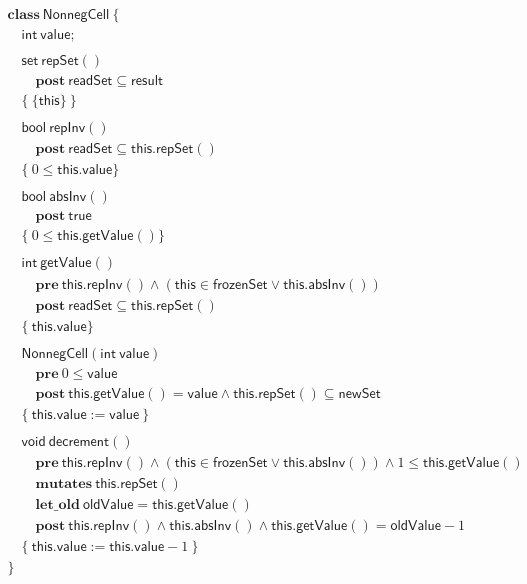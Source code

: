 \documentclass{article}
\begin{document}
$$\begin{array}{l}
\mathbf{class}\ \mathsf{NonnegCell}\ \{\\
\quad \mathsf{int}\ \mathsf{value};\\
\\
\quad \mathsf{set}\ \mathsf{repSet}()\\
\quad\quad \mathbf{post}\ \mathsf{readSet} \subseteq \mathsf{result}\\
\quad \{\ \{\mathsf{this}\}\ \}\\
\\
\quad \mathsf{bool}\ \mathsf{repInv}()\\
\quad\quad \mathbf{post}\ \mathsf{readSet} \subseteq \mathsf{this}.\mathsf{repSet}()\\
\quad \{\ 0 \le \mathsf{this}.\mathsf{value} \}\\
\\
\quad \mathsf{bool}\ \mathsf{absInv}()\\
\quad\quad \mathbf{post}\ \mathsf{true}\\
\quad \{\ 0 \le \mathsf{this}.\mathsf{getValue}() \}\\
\\
\quad \mathsf{int}\ \mathsf{getValue}()\\
\quad\quad \mathbf{pre}\ \mathsf{this}.\mathsf{repInv}() \land (\mathsf{this} \in \mathsf{frozenSet} \lor \mathsf{this}.\mathsf{absInv}())\\
\quad\quad \mathbf{post}\ \mathsf{readSet} \subseteq \mathsf{this}.\mathsf{repSet}()\\
\quad \{\ \mathsf{this}.\mathsf{value} \}\\
\\
\quad \mathsf{NonnegCell}(\mathsf{int}\ \mathsf{value})\\
\quad\quad \mathbf{pre}\ 0 \le \mathsf{value}\\
\quad\quad \mathbf{post}\ \mathsf{this}.\mathsf{getValue}() = \mathsf{value} \land \mathsf{this}.\mathsf{repSet}() \subseteq \mathsf{newSet}\\
\quad \{\ \mathsf{this}.\mathsf{value} := \mathsf{value}\ \}\\
\\
\quad \mathsf{void}\ \mathsf{decrement}()\\
\quad\quad \mathbf{pre}\ \mathsf{this}.\mathsf{repInv}() \land (\mathsf{this} \in \mathsf{frozenSet} \lor \mathsf{this}.\mathsf{absInv}()) \land 1 \le \mathsf{this}.\mathsf{getValue}()\\
\quad\quad \mathbf{mutates}\ \mathsf{this}.\mathsf{repSet}()\\
\quad\quad \mathbf{let\_old}\ \mathsf{oldValue} = \mathsf{this}.\mathsf{getValue}()\\
\quad\quad \mathbf{post}\ \mathsf{this}.\mathsf{repInv}() \land \mathsf{this}.\mathsf{absInv}() \land \mathsf{this}.\mathsf{getValue}() = \mathsf{oldValue} - 1\\
\quad \{\ \mathsf{this}.\mathsf{value} := \mathsf{this}.\mathsf{value} - 1\ \}\\
\}
\end{array}$$
\end{document}
